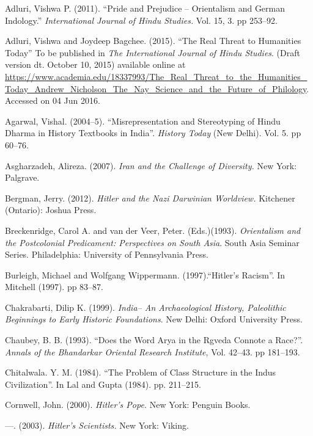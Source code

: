 \begin{thebibliography}{99}
\itemsep=1pt
 Adluri, Vishwa P. (2011). “Pride and Prejudice – Orientalism and German Indology.” \textit{International Journal of Hindu Studies.} Vol. 15, 3. pp 253–92.

  Adluri, Vishwa and Joydeep Bagchee. (2015). “The Real Threat to Humanities Today” To be published in \textit{The International Journal of Hindu Studies}. (Draft version dt. October 10, 2015) available online at \url{https://www.academia.edu/18337993/The_Real_Threat_to_the_Humanities_Today_Andrew_Nicholson_The_Nay_Science_and_the_Future_of_Philology}. Accessed on 04 Jun 2016.

  Agarwal, Vishal. (2004–5). “Misrepresentation and Stereotyping of Hindu Dharma in History Textbooks in India”. \textit{History Today} (New Delhi). Vol. 5. pp 60–76.

  Asgharzadeh, Alireza. (2007). \textit{Iran and the Challenge of Diversity. }New York: Palgrave.

  Bergman, Jerry. (2012). \textit{Hitler and the Nazi Darwinian Worldview.} Kitchener (Ontario): Joshua Press.

  Breckenridge, Carol A. and van der Veer, Peter. (Eds.)(1993). \textit{Orientalism and the Postcolonial Predicament: Perspectives on South Asia}. South Asia Seminar Series. Philadelphia: University of Pennsylvania Press.

  Burleigh, Michael and Wolfgang Wippermann. (1997).“Hitler’s Racism”. In Mitchell (1997). pp 83–87.

  Chakrabarti, Dilip K. (1999). \textit{India– An Archaeological History, Paleolithic Beginnings to Early Historic Foundations}. New Delhi: Oxford University Press.

  Chaubey, B. B. (1993). “Does the Word Arya in the Rgveda Connote a Race?”. \textit{Annals of the Bhandarkar Oriental Research Institute}, Vol. 42–43. pp 181–193.

  Chitalwala. Y. M. (1984). “The Problem of Class Structure in the Indus Civilization”. In Lal and Gupta (1984). pp. 211–215.

  Cornwell, John. (2000). \textit{Hitler’s Pope. }New York: Penguin Books.

  —. (2003). \textit{Hitler’s Scientists.} New York: Viking.


\end{thebibliography}
